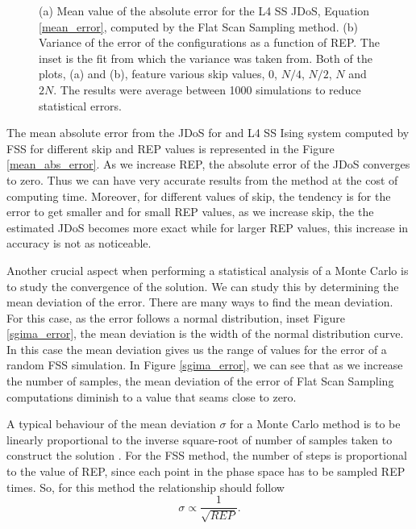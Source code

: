 \begin{figure}[h]
	\centering
	\caption{(a) Mean value of the absolute error for the L4 SS JDoS, Equation \ref{mean_error}, computed by the Flat Scan Sampling method. (b) Variance of the error of the configurations as a function of REP. The inset is the fit from which the variance was taken from. Both of the plots, (a) and (b), feature various skip values, $0$, $N/4$, $N/2$, $N$ and $2N$. The results were average between 1000 simulations to reduce statistical errors.}
\end{figure}

	The mean absolute error from the JDoS for and L4 SS Ising system computed by FSS for different skip and REP values is represented in the Figure \ref{mean_abs_error}. As we increase REP, the absolute error of the JDoS converges to zero. Thus we can have very accurate results from the method at the cost of computing time. 
Moreover, for different values of skip, the tendency is for the error to get smaller and for small REP values, as we increase skip, the the estimated JDoS becomes more exact while for larger REP values, this increase in accuracy is not as noticeable.

	Another crucial aspect when performing a statistical analysis of a Monte Carlo is to study the convergence of the solution. We can study this by determining the mean deviation of the error. There are many ways to find the mean deviation. For this case, as the error follows a normal distribution, inset Figure \ref{sgima_error}, the mean deviation is the width of the normal distribution curve. In this case the mean deviation gives us the range of values for the error of a random FSS simulation. In Figure \ref{sgima_error}, we can see that as we increase the number of samples, the mean  deviation of the error of Flat Scan Sampling computations diminish to a value that seams close to zero.
	
	A typical behaviour of the mean deviation $\sigma$ for a Monte Carlo method is to be linearly proportional to the inverse square-root of number of samples taken to construct the solution \cite{Landau_Book}. For the FSS method, the number of steps is proportional to the value of REP, since each point in the phase space has to be sampled REP times. So, for this method the relationship should follow 
\begin{equation}\label{standard_mc}
	\sigma \propto \frac{1}{\sqrt{REP}}.
\end{equation}

